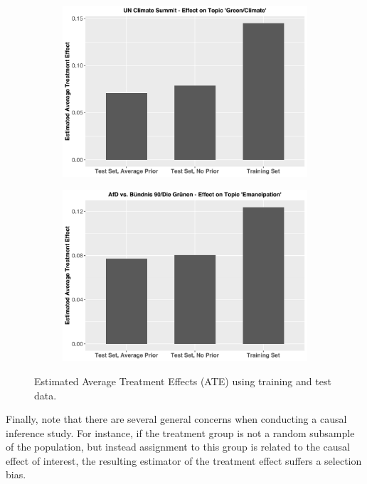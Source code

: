 \begin{figure}[h!]
  \centering
  \captionsetup{justification=centering,margin=2cm}
  \begin{subfigure}[b]{0.49\linewidth}
    \includegraphics[width=\linewidth]{../plots/6_2/climate_summit_ate.pdf}
  \end{subfigure}
  \begin{subfigure}[b]{0.49\linewidth}
    \includegraphics[width=\linewidth]{../plots/6_2/emancipation_ate.pdf}
  \end{subfigure}
  \caption{Estimated Average Treatment Effects (ATE) using training and test data.}
  \label{fig:causal_inference_ate}
\end{figure}

Finally, note that there are several general concerns when conducting a causal inference study. For instance, if the treatment group is not a random subsample of the population, but instead assignment to this group is related to the causal effect of interest, the resulting estimator of the treatment effect suffers a selection bias.